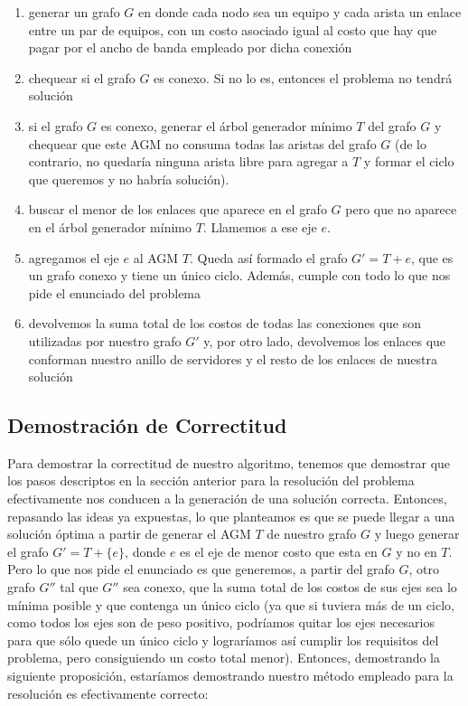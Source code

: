 \documentclass[11pt, a4paper, twoside]{article}
\begin{document}
\begin{enumerate}
  \item generar un grafo $G$ en donde cada nodo sea un equipo y cada arista un
        enlace entre un par de equipos, con un costo asociado igual al costo
        que hay que pagar por el ancho de banda empleado por dicha conexión
  \item chequear si el grafo $G$ es conexo. Si no lo es, entonces el problema
        no tendrá solución
  \item si el grafo $G$ es conexo, generar el árbol generador mínimo $T$ del grafo
        $G$ y chequear que este AGM no consuma todas las aristas del grafo $G$ (de
        lo contrario, no quedaría ninguna arista libre para agregar a $T$ y formar
        el ciclo que queremos y no habría solución).
  \item buscar el menor de los enlaces que aparece en el grafo $G$ pero que no 
        aparece en el árbol generador mínimo $T$. Llamemos a ese eje $e$.
  \item agregamos el eje $e$ al AGM $T$. Queda así formado el grafo $G' = T + e$,
        que es un grafo conexo y tiene un único ciclo. Además, cumple con todo lo
        que nos pide el enunciado del problema
  \item devolvemos la suma total de los costos de todas las conexiones que son
        utilizadas por nuestro grafo $G'$ y, por otro lado, devolvemos los enlaces
        que conforman nuestro anillo de servidores y el resto de los enlaces 
        de nuestra solución
        
\end{enumerate}

\subsection{Demostración de Correctitud}
Para demostrar la correctitud de nuestro algoritmo, tenemos que demostrar que los
pasos descriptos en la sección anterior para la resolución del problema 
efectivamente nos conducen a la generación de una solución correcta. Entonces,
repasando las ideas ya expuestas, lo que planteamos es que se puede llegar a una
solución óptima a partir de generar el AGM $T$ de nuestro grafo $G$ y luego generar
el grafo $G' = T + \{e\}$, donde $e$ es el eje de menor costo que esta en $G$ y
no en $T$. Pero lo que nos pide el enunciado es que generemos, a partir del grafo $G$,
otro grafo $G''$ tal que $G''$ sea conexo, que la suma
total de los costos de sus ejes sea lo mínima posible y que contenga un único ciclo 
(ya que si tuviera 
más de un ciclo, como todos los ejes son de peso positivo, podríamos quitar los ejes 
necesarios para que sólo quede un único ciclo y lograríamos así cumplir los requisitos
del problema, pero consiguiendo un costo total menor). Entonces, demostrando la 
siguiente proposición, estaríamos demostrando nuestro método empleado para la resolución
es efectivamente correcto:
\end{document}
